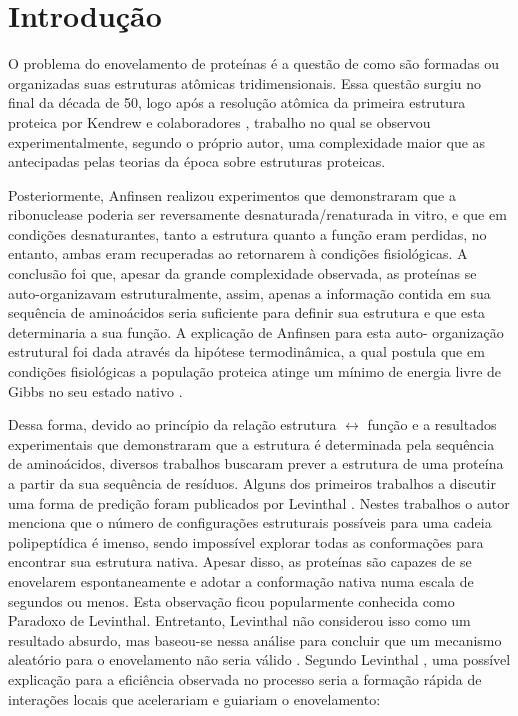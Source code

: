 \chapter{Introdução}\label{ch:introducao}

O problema do enovelamento de proteínas é a questão de como são formadas ou organizadas suas estruturas atômicas tridimensionais. Essa questão surgiu no final da década de 50, logo após a resolução atômica da primeira estrutura proteica por Kendrew e colaboradores \cite{KENDREW1958}, trabalho no qual se observou experimentalmente, segundo o próprio autor, uma complexidade maior que as antecipadas pelas teorias da época sobre estruturas proteicas. 

Posteriormente, Anfinsen \cite{Anfinsen:1968} realizou experimentos que demonstraram que a ribonuclease poderia ser reversamente desnaturada/renaturada in vitro, e que em condições desnaturantes, tanto a estrutura quanto a função eram perdidas, no entanto, ambas eram recuperadas ao retornarem à condições fisiológicas. A conclusão foi que, apesar da grande complexidade observada, as proteínas se auto-organizavam estruturalmente, assim, apenas a informação contida em sua sequência de aminoácidos seria suficiente para definir sua estrutura e que esta determinaria a sua função. A explicação de Anfinsen para esta auto- organização estrutural foi dada através da hipótese termodinâmica, a qual postula que em condições fisiológicas a população proteica atinge um mínimo de energia livre de Gibbs no seu estado nativo \cite{Rose:2001}.

Dessa forma, devido ao princípio da relação estrutura $\leftrightarrow$ função e a resultados experimentais que demonstraram que a estrutura é determinada pela sequência de aminoácidos, diversos trabalhos buscaram prever a estrutura de uma proteína a partir da sua sequência de resíduos. Alguns dos primeiros trabalhos a discutir uma forma de predição foram publicados por Levinthal \cite{Levinthal:1963, Levinthal:}. Nestes trabalhos o autor menciona que o número de configurações estruturais possíveis para uma cadeia polipeptídica é imenso, sendo impossível explorar todas as conformações para encontrar sua estrutura nativa. Apesar disso, as proteínas são capazes de se enovelarem espontaneamente e adotar a conformação nativa numa escala de segundos ou menos. Esta observação ficou popularmente conhecida como Paradoxo de Levinthal. Entretanto, Levinthal não considerou isso como um resultado absurdo, mas baseou-se nessa análise para concluir que um mecanismo aleatório para o enovelamento não seria válido \cite{Ben-Naim:2007}. Segundo Levinthal \cite{Levinthal:}, uma possível explicação para a eficiência observada no processo seria a formação rápida de interações locais que acelerariam e guiariam o enovelamento:

